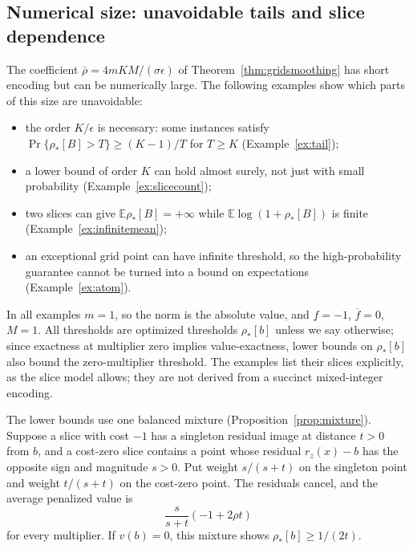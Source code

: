 \subsection{Numerical size: unavoidable tails and slice dependence}
\label{sec:numerical-size}
The coefficient $\bar\rho=4mKM/(\sigma\epsilon)$ of
Theorem~\ref{thm:gridsmoothing} has short encoding but can be
numerically large. The following examples show which parts of this size
are unavoidable:
\begin{itemize}
 \item[(a)] the order $K/\epsilon$ is necessary: some instances satisfy
 $\Pr\{\rho_*[B]>T\}\ge(K-1)/T$ for $T\ge K$
 (Example~\ref{ex:tail});
 \item[(b)] a lower bound of order $K$ can hold almost surely, not just
 with small probability (Example~\ref{ex:slicecount});
 \item[(c)] two slices can give $\mathbb E\rho_*[B]=+\infty$ while
 $\mathbb E\log(1+\rho_*[B])$ is finite (Example~\ref{ex:infinitemean});
 \item[(d)] an exceptional grid point can have infinite threshold, so
 the high-probability guarantee cannot be turned into a bound on
 expectations (Example~\ref{ex:atom}).
\end{itemize}
In all examples $m=1$, so the norm is the absolute value, and
$\underline f=-1$, $\overline f=0$, $M=1$. All thresholds are optimized
thresholds $\rho_*[b]$ unless we say otherwise; since exactness at
multiplier zero implies value-exactness, lower bounds on $\rho_*[b]$ also
bound the zero-multiplier threshold. The examples list their slices
explicitly, as the slice model allows; they are not derived from a
succinct mixed-integer encoding.

The lower bounds use one balanced mixture
(Proposition~\ref{prop:mixture}). Suppose a slice with cost $-1$ has a
singleton residual image at distance $t>0$ from $b$, and a cost-zero
slice contains a point whose residual $r_z(x)-b$ has the opposite sign
and magnitude $s>0$. Put weight
$s/(s+t)$ on the singleton point and weight $t/(s+t)$ on the cost-zero
point. The residuals cancel, and the average penalized value is
\begin{equation}\label{eq:tailmixture}
 \frac{s}{s+t}(-1+2\rho t)
\end{equation}
for every multiplier. If $v(b)=0$, this mixture shows
$\rho_*[b]\ge1/(2t)$.

